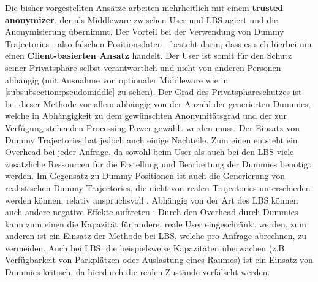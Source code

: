 Die bisher vorgestellten Ansätze arbeiten mehrheitlich mit einem \textbf{trusted anonymizer}, der als Middleware zwischen User und LBS agiert und die Anonymisierung übernimmt. Der Vorteil bei der Verwendung von Dummy Trajectories - also falschen Positionsdaten - besteht darin, dass es sich hierbei um einen \textbf{Client-basierten Ansatz} handelt. Der User ist somit für den Schutz seiner Privatsphäre selbst verantwortlich und nicht von anderen Personen abhängig (mit Ausnahme von optionaler Middleware wie in \ref{subsubsection:pseudomiddle} zu sehen). 
Der Grad des Privatsphäreschutzes ist bei dieser Methode vor allem abhängig von der Anzahl der generierten Dummies, welche in Abhängigkeit zu dem gewünschten Anonymitätsgrad und der zur Verfügung stehenden Processing Power gewählt werden muss.
Der Einsatz von Dummy Trajectories hat jedoch auch einige Nachteile. Zum einen entsteht ein Overhead bei jeder Anfrage, da sowohl beim User als auch bei den LBS viele zusätzliche Ressourcen für die Erstellung und Bearbeitung der Dummies benötigt werden. Im Gegensatz zu Dummy Positionen ist auch die Generierung von realistischen Dummy Trajectories, die nicht von realen Trajectories unterschieden werden können, relativ anspruchsvoll \cite{Beresford2003}. Abhängig von der Art des LBS können auch andere negative Effekte auftreten \cite{Beresford2005}: Durch den Overhead durch Dummies kann zum einen die Kapazität für andere, reale User eingeschränkt werden, zum anderen ist ein Einsatz der Methode bei LBS, welche pro Anfrage abrechnen, zu vermeiden. Auch bei LBS, die beispielsweise Kapazitäten überwachen (z.B. Verfügbarkeit von Parkplätzen oder Auslastung eines Raumes) ist ein Einsatz von Dummies kritisch, da hierdurch die realen Zustände verfälscht werden.

